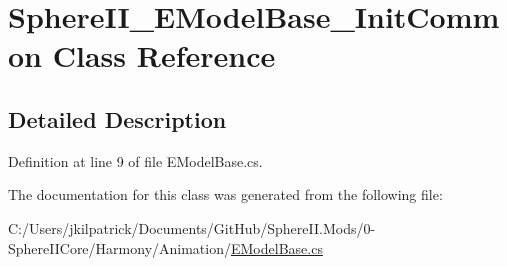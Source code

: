 \hypertarget{class_sphere_i_i___e_model_base___init_common}{}\section{Sphere\+I\+I\+\_\+\+E\+Model\+Base\+\_\+\+Init\+Common Class Reference}
\label{class_sphere_i_i___e_model_base___init_common}


\subsection{Detailed Description}


Definition at line 9 of file E\+Model\+Base.\+cs.



The documentation for this class was generated from the following file\+:\begin{DoxyCompactItemize}
\item 
C\+:/\+Users/jkilpatrick/\+Documents/\+Git\+Hub/\+Sphere\+I\+I.\+Mods/0-\/\+Sphere\+I\+I\+Core/\+Harmony/\+Animation/\mbox{\hyperlink{_e_model_base_8cs}{E\+Model\+Base.\+cs}}\end{DoxyCompactItemize}
